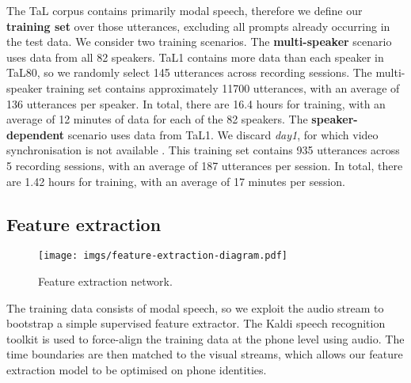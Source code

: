 \documentclass[a4paper]{article}
\begin{document}
The TaL corpus contains primarily modal speech, therefore we define our \textbf{training set} over those utterances, excluding all prompts already occurring in the test data.
We consider two training scenarios.
The \textbf{multi-speaker} scenario uses data from all 82 speakers.
TaL1 contains more data than each speaker in TaL80, so we randomly select 145 utterances across recording sessions.
The multi-speaker training set contains approximately 11700 utterances, with an average of 136 utterances per speaker.
In total, there are 16.4 hours for training, with an average of 12 minutes of data for each of the 82 speakers.
The \textbf{speaker-dependent} scenario uses data from TaL1.
We discard \emph{day1}, for which video synchronisation is not available \cite{ribeiro2021tal}.
This training set contains 935 utterances across 5 recording sessions, with an average of 187 utterances per session.
In total, there are 1.42 hours for training, with an average of 17 minutes per session.


\subsection{Feature extraction}

\begin{figure}[t]
  \centering
  \texttt{[image: imgs/feature-extraction-diagram.pdf]}
  \caption{Feature extraction network.}
  \label{fig:feature-extraction-diagram}
\end{figure}


The training data consists of modal speech, so we exploit the audio stream to bootstrap a simple supervised feature extractor.
The Kaldi speech recognition toolkit \cite{povey2011kaldi} is used to force-align the training data at the phone level using audio.
The time boundaries are then matched to the visual streams, which allows our feature extraction model to be optimised on phone identities.
\end{document}
